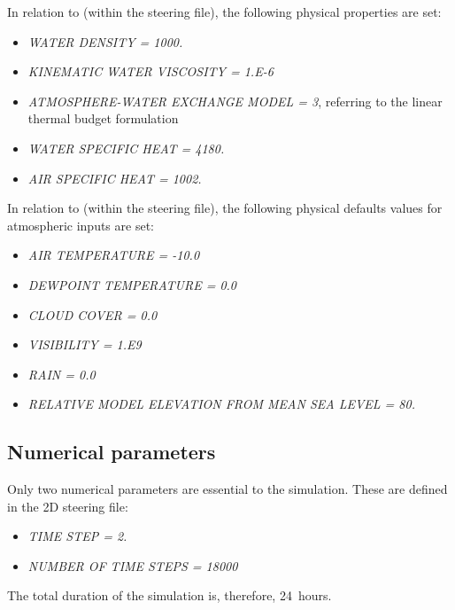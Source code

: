 In relation to \waqtel (within the \waqtel steering file), the following physical properties are set:
\begin{itemize}
    \item\textit{WATER DENSITY = 1000.}
    \item\textit{KINEMATIC WATER VISCOSITY = 1.E-6}
    \item\textit{ATMOSPHERE-WATER EXCHANGE MODEL = 3}, referring to the linear thermal budget formulation
    \item\textit{WATER SPECIFIC HEAT = 4180.}
    \item\textit{AIR SPECIFIC HEAT = 1002.}
\end{itemize}

In relation to \khione (within the \khione steering file), the following physical defaults values for atmospheric inputs are set: 
\begin{itemize}
    \item\textit{AIR TEMPERATURE      = -10.0}
    \item\textit{DEWPOINT TEMPERATURE =   0.0}
    \item\textit{CLOUD COVER          =   0.0}
    \item\textit{VISIBILITY           =   1.E9}
    \item\textit{RAIN                 =   0.0}
    \item\textit{RELATIVE MODEL ELEVATION FROM MEAN SEA LEVEL = 80.}
\end{itemize}

\subsection{Numerical parameters}
Only two numerical parameters are essential to the simulation. These are defined in the \telemac2D steering file:
\begin{itemize}
\item\textit{TIME STEP = 2.}
\item\textit{NUMBER OF TIME STEPS = 18000}
\end{itemize}
The total duration of the simulation is, therefore, 24~hours.

